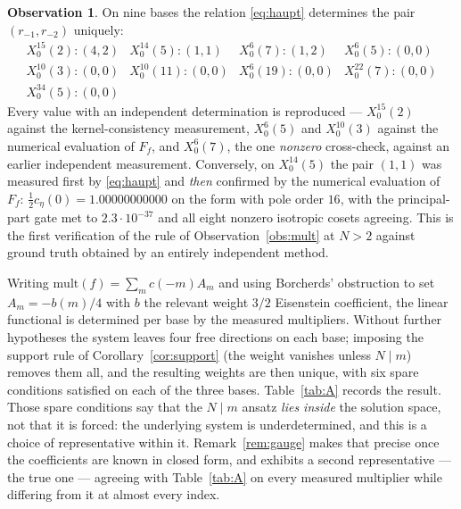 \documentclass[11pt,reqno]{amsart}
\theoremstyle{plain}
\theoremstyle{definition}
\newtheorem{observation}[theorem]{Observation}
\begin{document}
\begin{observation}\label{obs:haupt}
On nine bases the relation \eqref{eq:haupt} determines the pair $(r_{-1},r_{-2})$ uniquely:
\[
\begin{array}{llll}
X_0^{15}(2)\colon (4,2) & X_0^{14}(5)\colon (1,1) & X_0^{6}(7)\colon (1,2) & X_0^{6}(5)\colon (0,0)\\
X_0^{10}(3)\colon (0,0) & X_0^{10}(11)\colon (0,0) & X_0^{6}(19)\colon (0,0) & X_0^{22}(7)\colon (0,0)\\
X_0^{34}(5)\colon (0,0) & & &
\end{array}
\]
Every value with an independent determination is reproduced --- $X_0^{15}(2)$ against the
kernel-consistency measurement, $X_0^{6}(5)$ and $X_0^{10}(3)$ against the numerical evaluation of
$F_f$, and $X_0^{6}(7)$, the one \emph{nonzero} cross-check, against an earlier independent
measurement. Conversely, on $X_0^{14}(5)$ the pair $(1,1)$ was measured first by
\eqref{eq:haupt} and \emph{then} confirmed by the numerical evaluation of $F_f$:
$\tfrac12 c_\eta(0)=1.00000000000$ on the form with pole order $16$, with the principal-part gate
met to $2.3\cdot10^{-37}$ and all eight nonzero isotropic cosets agreeing. This is the first
verification of the rule of Observation~\ref{obs:mult} at $N>2$ against ground truth obtained by
an entirely independent method.
\end{observation}

Writing $\mathrm{mult}(f)=\sum_m c(-m)A_m$ and using Borcherds' obstruction to set
$A_m=-b(m)/4$ with $b$ the relevant weight $3/2$ Eisenstein coefficient, the linear functional is
determined per base by the measured multipliers. Without further hypotheses the system leaves four
free directions on each base; imposing the support rule of Corollary~\ref{cor:support} (the weight
vanishes unless $N\mid m$) removes them all, and the resulting weights are then unique, with six
spare conditions satisfied on each of the three bases. Table~\ref{tab:A} records the result. Those
spare conditions say that the $N\mid m$ ansatz \emph{lies inside} the solution space, not that it
is forced: the underlying system is underdetermined, and this is a choice of representative within
it. Remark~\ref{rem:gauge} makes that precise once the coefficients are known in closed form, and
exhibits a second representative --- the true one --- agreeing with Table~\ref{tab:A} on every
measured multiplier while differing from it at almost every index.
\end{document}
